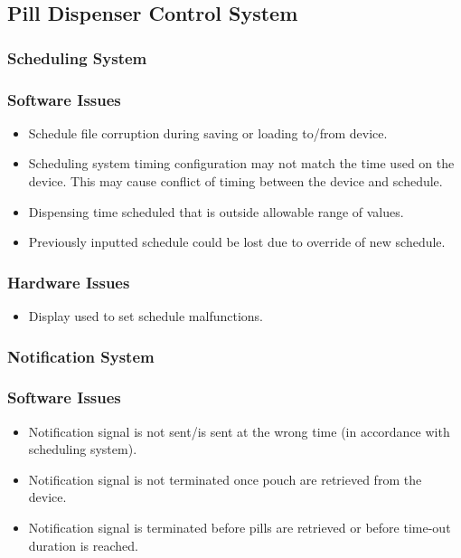 \documentclass[12pt]{article}
\begin{document}
\subsection{Pill Dispenser Control System}
\subsubsection{Scheduling System}
\subsubsection*{Software Issues}
\begin{itemize}
\item Schedule file corruption during saving or loading to/from device.
\item Scheduling system timing configuration may not match the time used on the device. This may cause conflict of timing between the device and schedule.
\item Dispensing time scheduled that is outside allowable range of values.
\item Previously inputted schedule could be lost due to override of new schedule.
\end{itemize}
\subsubsection*{Hardware Issues}
\begin{itemize}
\item Display used to set schedule malfunctions.
\end{itemize}

\subsubsection{Notification System}
\subsubsection*{Software Issues}
\begin{itemize}
\item Notification signal is not sent/is sent at the wrong time (in accordance with scheduling system).
\item Notification signal is not terminated once pouch are retrieved from the device.
\item Notification signal is terminated before pills are retrieved or before time-out duration is reached.
\end{itemize}
\end{document}
